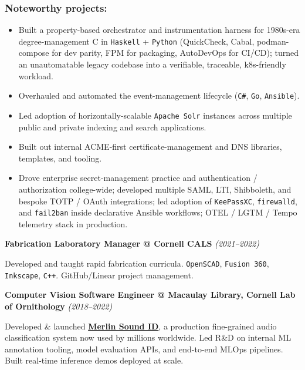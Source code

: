 \documentclass[10pt,letterpaper]{article}
\newcommand{\role}[2]{%
    \noindent\textbf{\color{secondary}#1} \hfill \textit{\color{muted}(#2)}\par\vspace{0.3em}
}
\newcommand{\tech}[1]{\texttt{\small\color{secondary}#1}}
\newcommand{\cvlink}[2]{\href{#1}{\color{linkcolor}#2}}
\begin{document}
\subsubsection{Noteworthy projects:}
\begin{itemize}
    \item Built a property-based orchestrator and instrumentation harness for 1980s-era degree-management C in \tech{Haskell} + \tech{Python} (QuickCheck, Cabal, podman-compose for dev parity, FPM for packaging, AutoDevOps for CI/CD); turned an unautomatable legacy codebase into a verifiable, traceable, k8s-friendly workload.
    \item Overhauled and automated the event-management lifecycle (\tech{C\#}, \tech{Go}, \tech{Ansible}).
    \item Led adoption of horizontally-scalable \tech{Apache Solr} instances across multiple public and private indexing and search applications.
    \item Built out internal ACME-first certificate-management and DNS libraries, templates, and tooling.
    \item Drove enterprise secret-management practice and authentication / authorization college-wide; developed multiple SAML, LTI, Shibboleth, and bespoke TOTP / OAuth integrations; led adoption of \tech{KeePassXC}, \tech{firewalld}, and \tech{fail2ban} inside declarative Ansible workflows; OTEL / LGTM / Tempo telemetry stack in production.
\end{itemize}

\vspace{0.4em}

\role{Fabrication Laboratory Manager @ Cornell CALS}{2021--2022}

Developed and taught rapid fabrication curricula. \tech{OpenSCAD}, \tech{Fusion 360}, \tech{Inkscape}, \tech{C++}. GitHub/Linear project management.

\vspace{0.4em}

\role{Computer Vision Software Engineer @ Macaulay Library, Cornell Lab of Ornithology}{2018--2022}

Developed \& launched \cvlink{https://merlin.allaboutbirds.org/download/}{\textbf{Merlin Sound ID}}, a production fine-grained audio classification system now used by millions worldwide. Led R\&D on internal ML annotation tooling, model evaluation APIs, and end-to-end MLOps pipelines. Built real-time inference demos deployed at scale.
\end{document}
